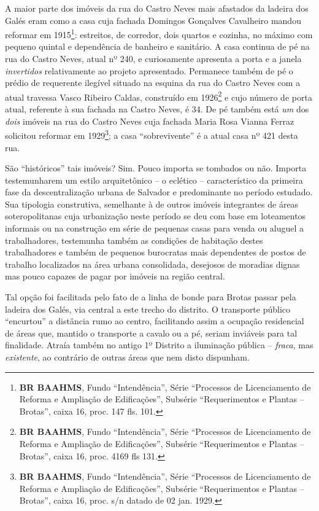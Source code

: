A maior parte dos imóveis da rua do Castro Neves mais afastados da ladeira dos Galés eram como a casa cuja fachada Domingos Gonçalves Cavalheiro mandou reformar em 1915\footnote{\textbf{BR BAAHMS}, Fundo ``Intendência'', Série ``Processos de Licenciamento de Reforma e Ampliação de Edificações'', Subsérie ``Requerimentos e Plantas -- Brotas'', caixa 16, proc. 147 fls. 101.}: estreitos, de corredor, dois quartos e cozinha, no máximo com pequeno quintal e dependência de banheiro e sanitário. A casa continua de pé na rua do Castro Neves, atual nº 240, e curiosamente apresenta a porta e a janela \textit{invertidos} relativamente ao projeto apresentado. Permanece também de pé o prédio de requerente ilegível situado na esquina da rua do Castro Neves com a atual travessa Vasco Ribeiro Caldas, construído em 1926\footnote{\textbf{BR BAAHMS}, Fundo ``Intendência'', Série ``Processos de Licenciamento de Reforma e Ampliação de Edificações'', Subsérie ``Requerimentos e Plantas -- Brotas'', caixa 16, proc. 4169 fls 131.} e cujo número de porta atual, referente à sua fachada na Castro Neves, é 34. De pé também está \textit{um} dos \textit{dois} imóveis na rua do Castro Neves cuja fachada Maria Rosa Vianna Ferraz solicitou reformar em 1929\footnote{\textbf{BR BAAHMS}, Fundo ``Intendência'', Série ``Processos de Licenciamento de Reforma e Ampliação de Edificações'', Subsérie ``Requerimentos e Plantas -- Brotas'', caixa 16, proc. s/n datado de 02 jan. 1929.}; a casa ``sobrevivente'' é a atual casa nº 421 desta rua.

São ``históricos'' tais imóveis? Sim. Pouco importa se tombados ou não. Importa testemunharem um estilo arquitetônico -- o eclético -- característico da primeira fase da descentralização urbana de Salvador e predominante no período estudado. Sua tipologia construtiva, semelhante à de outros imóveis integrantes de áreas soteropolitanas cuja urbanização neste período se deu com base em loteamentos informais ou na construção em série de pequenas casas para venda ou aluguel a trabalhadores, testemunha também as condições de habitação destes trabalhadores e também de pequenos burocratas mais dependentes de postos de trabalho localizados na área urbana consolidada, desejosos de moradias dignas mas pouco capazes de pagar por imóveis na região central.


Tal opção foi facilitada pelo fato de a linha de bonde para Brotas passar pela ladeira dos Galés, via central a este trecho do distrito. O transporte público ``encurtou'' a distância rumo ao centro, facilitando assim a ocupação residencial de áreas que, mantido o transporte a cavalo ou a pé, seriam inviáveis para tal finalidade. Atraía também no antigo 1º Distrito a iluminação pública -- \textit{fraca}, mas \textit{existente}, ao contrário de outras áreas que nem disto dispunham.


